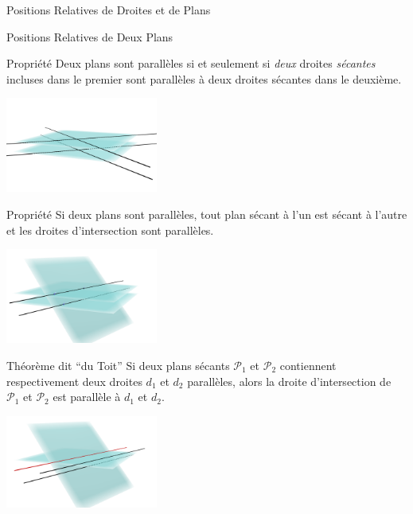 \documentclass{cours}
\begin{document}
\begin{Gpartie}{Positions Relatives de Droites et de Plans}
\begin{Spartie}{Positions Relatives de Deux Plans}
\begin{center}
            \end{center}
            \begin{SSpartie}{Propriété} 
                Deux plans sont parallèles si et seulement si \emph{deux} droites \emph{sécantes} incluses dans le premier sont parallèles à deux droites sécantes dans le deuxième.
                \begin{center}
                        \includegraphics[width=5cm]{rsc/11fig2.png}
                    \parbox{\linewidth}{}
                \end{center}
            \end{SSpartie}
            \pagebreak
            \begin{SSpartie}{Propriété} 
                Si deux plans sont parallèles, tout plan sécant à l'un est sécant à l'autre et les droites d'intersection sont parallèles.
                \begin{center}
                        \includegraphics[width=5cm]{rsc/11fig3.png}
                    \parbox{\linewidth}{}
                \end{center}
            \end{SSpartie}
            \begin{SSpartie}{Théorème dit ``du Toit''} 
                Si deux plans sécants $\mathcal{P}_1$ et $\mathcal{P}_2$ contiennent respectivement deux droites $d_1$ et $d_2$ parallèles, alors la droite d'intersection de $\mathcal{P}_1$ et $\mathcal{P}_2$ est parallèle à $d_1$ et $d_2$.
                \begin{center}
                        \includegraphics[width=5cm]{rsc/11fig4.png}

\end{center}
\end{SSpartie}
\end{Spartie}
\end{Gpartie}
\end{document}
